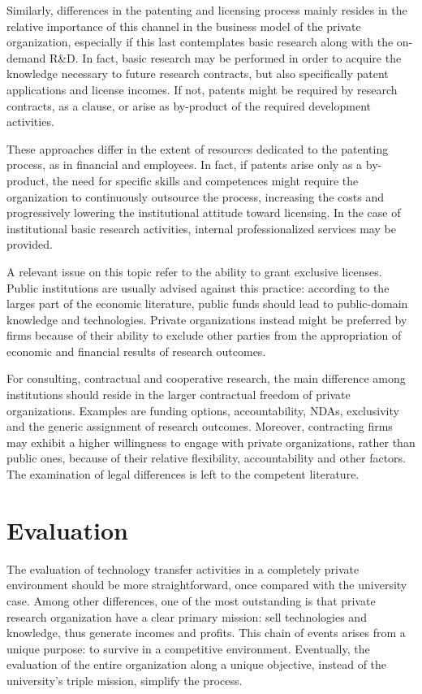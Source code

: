 Similarly, differences in the patenting and licensing process mainly resides in the relative importance of this channel in the business model of the private organization, especially if this last contemplates basic research along with the on-demand R\&D. In fact, basic research may be performed in order to acquire the knowledge necessary to future research contracts, but also specifically patent applications and license incomes. If not, patents might be required by research contracts, as a clause, or arise as by-product of the required development activities.

These approaches differ in the extent of resources dedicated to the patenting process, as in financial and employees. In fact, if patents arise only as a by-product, the need for specific skills and competences might require the organization to continuously outsource the process, increasing the costs and progressively lowering the institutional attitude toward licensing. In the case of institutional basic research activities, internal professionalized services may be provided.

A relevant issue on this topic refer to the ability to grant exclusive licenses. Public institutions are usually advised against this practice: according to the larges part of the economic literature, public funds should lead to public-domain knowledge and technologies. Private organizations instead might be preferred by firms because of their ability to exclude other parties from the appropriation of economic and financial results of research outcomes.

For consulting, contractual and cooperative research, the main difference among institutions should reside in the larger contractual freedom of private organizations. Examples are funding options, accountability, NDAs, exclusivity and the generic assignment of research outcomes. Moreover, contracting firms may exhibit a higher willingness to engage with private organizations, rather than public ones, because of their relative flexibility, accountability and other factors. The examination of legal differences is left to the competent literature.

\section{Evaluation}

The evaluation of technology transfer activities in a completely private environment should be more straightforward, once compared with the university case. Among other differences, one of the most outstanding is that private research organization have a clear primary mission: sell technologies and knowledge, thus generate incomes and profits. This chain of events arises from a unique purpose: to survive in a competitive environment. Eventually, the evaluation of the entire organization along a unique objective, instead of the university's triple mission, simplify the process. 

